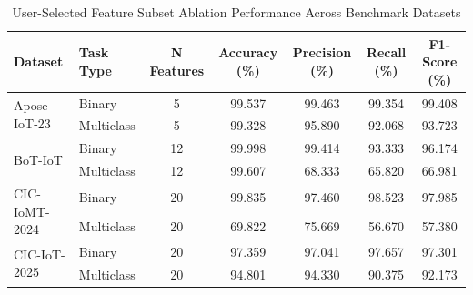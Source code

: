 \documentclass[a4paper,fleqn]{cas-sc}
\begin{document}
\begin{table}
\centering
\caption{User-Selected Feature Subset Ablation Performance Across Benchmark Datasets}
\label{tab:feature_ablation}
\begin{tabular}{llccccc}
\toprule
\textbf{Dataset} & \textbf{Task Type} & \textbf{N Features} & \textbf{Accuracy} (\%) & \textbf{Precision} (\%) & \textbf{Recall} (\%) & \textbf{F1-Score} (\%) \\
\midrule
\multirow{2}{*}{Apose-IoT-23} & Binary & 5 & 99.537 & 99.463 & 99.354 & 99.408 \\
 & Multiclass & 5 & 99.328 & 95.890 & 92.068 & 93.723 \\
\midrule
\multirow{2}{*}{BoT-IoT} & Binary & 12 & 99.998 & 99.414 & 93.333 & 96.174 \\
 & Multiclass & 12 & 99.607 & 68.333 & 65.820 & 66.981 \\
\midrule
\multirow{2}{*}{CIC-IoMT-2024} & Binary & 20 & 99.835 & 97.460 & 98.523 & 97.985 \\
 & Multiclass & 20 & 69.822 & 75.669 & 56.670 & 57.380 \\
\midrule
\multirow{2}{*}{CIC-IoT-2025} & Binary & 20 & 97.359 & 97.041 & 97.657 & 97.301 \\
 & Multiclass & 20 & 94.801 & 94.330 & 90.375 & 92.173 \\
\bottomrule
\end{tabular}
\end{table}
\end{document}
